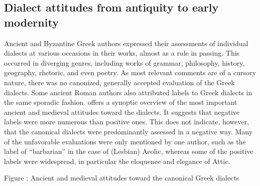 \documentclass[output=paper]{langsci/langscibook}
\begin{document}
\subsection{Dialect attitudes from antiquity to early modernity}
\hypertarget{Toc19704851}{}
Ancient and Byzantine Greek authors expressed their assessments of individual dialects at various occasions in their works, almost as a rule in passing. This occurred in diverging genres, including works of grammar, philosophy, history, geography, rhetoric, and even poetry. As most relevant comments are of a cursory nature, there was no canonized, generally accepted evaluation of the Greek dialects. Some ancient Roman authors also attributed labels to Greek dialects in the same sporadic fashion.  offers a synoptic overview of the most important ancient and medieval attitudes toward the dialects. It suggests that negative labels were more numerous than positive ones. This does not indicate, however, that the canonical dialects were predominantly assessed in a negative way. Many of the unfavorable evaluations were only mentioned by one author, such as the label of “barbarian” in the case of (Lesbian) Aeolic, whereas some of the positive labels were widespread, in particular the eloquence and elegance of Attic.

\begin{stylecaption}
Figure : Ancient and medieval attitudes toward the canonical Greek dialects
\end{stylecaption}

\tablefirsthead{}
\end{document}
